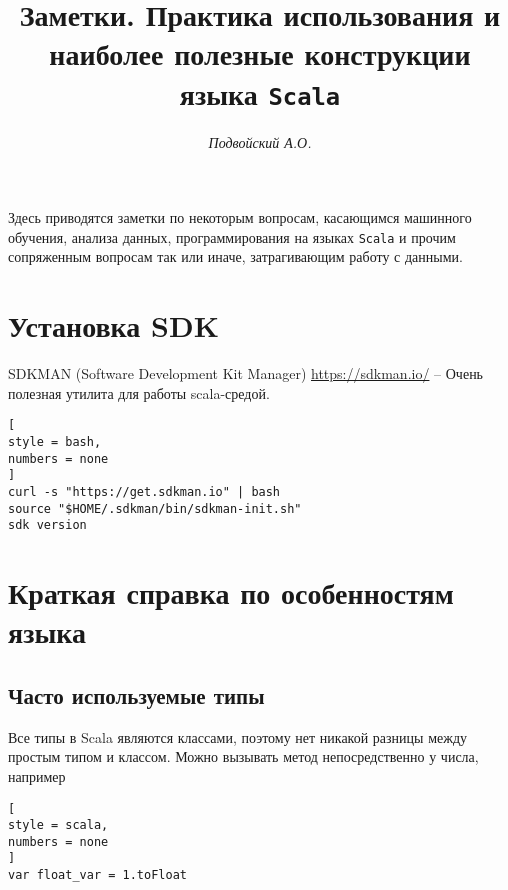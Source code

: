 \documentclass[%
	11pt,
	a4paper,
	utf8,
		]{article}
\begin{document}
\title{Заметки. Практика использования и наиболее полезные конструкции языка \texttt{Scala}}

\author{\itshape Подвойский А.О.}

\date{}
\maketitle

\thispagestyle{fancy}

Здесь приводятся заметки по некоторым вопросам, касающимся машинного обучения, анализа данных, программирования на языках \texttt{Scala} и прочим сопряженным вопросам так или иначе, затрагивающим работу с данными.



\tableofcontents

\section{Установка SDK}

SDKMAN (Software Development Kit Manager) \url{https://sdkman.io/} -- Очень полезная утилита для работы scala-средой.

\begin{lstlisting}[
style = bash,
numbers = none	
]
curl -s "https://get.sdkman.io" | bash
source "$HOME/.sdkman/bin/sdkman-init.sh"
sdk version
\end{lstlisting}

\section{Краткая справка по особенностям языка}

\subsection{Часто используемые типы}

Все типы в Scala являются классами, поэтому нет никакой разницы между простым типом и классом. Можно вызывать метод непосредственно у числа, например
\begin{lstlisting}[
style = scala,
numbers = none
]
var float_var = 1.toFloat
\end{lstlisting}
\end{document}
